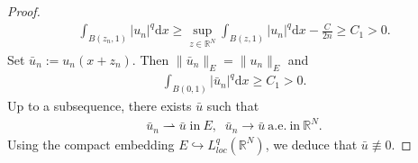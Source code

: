 \documentclass[12pt,a4paper,reqno]{amsart}
\numberwithin{equation}{section}
\begin{document}
\begin{proof}
\begin{equation*}
\begin{aligned}
\int_{B(z_{n},1)}
|u_{n}|^{q}
\mathrm{d}x
\geqslant
\sup_{z\in \mathbb{R}^{N}}
\int_{B(z,1)}
|u_{n}|^{q}
\mathrm{d}x
-
\frac{C}{2n}
\geqslant
C_{1}>0.
\end{aligned}
\end{equation*}
Set $\bar{u}_{n}:=u_{n}(x+z_{n})$. Then $\|\bar{u}_{n}\|_{E}=\|u_{n}\|_{E}$ and
\begin{equation*}
\begin{aligned}
\int_{B(0,1)}
|\bar{u}_{n}|^{q}
\mathrm{d}x
\geqslant
C_{1}>0.
\end{aligned}
\end{equation*}
Up to a subsequence,
there exists
$\bar{u}$
such that
\begin{equation*}
\begin{aligned}
\bar{u}_{n}\rightharpoonup \bar{u}
\;
\mathrm{in}
~
E,
\;\;
\bar{u}_{n}\rightarrow \bar{u}
~
\mathrm{a.e. ~in}
~
\mathbb{R}^{N}.
\end{aligned}
\end{equation*}
Using the compact embedding
$E
\hookrightarrow
L^{q}_{loc}(\mathbb{R}^{N})$,
we deduce that
$\bar{u}\not\equiv0$.
\end{proof}
\end{document}
